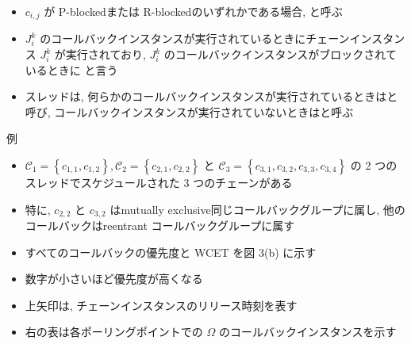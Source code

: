 \begin{frame}{}
    \begin{itemize}
        \item $c_{i, j}$ が P-blockedまたは R-blockedのいずれかである場合, と呼ぶ
        \item $J_{i}^{k}$ のコールバックインスタンスが実行されているときにチェーンインスタンス $J_{i}^{k}$ が実行されており, $J_{i}^{k}$ のコールバックインスタンスがブロックされているときに と言う
        \item スレッドは, 何らかのコールバックインスタンスが実行されているときはと呼び, コールバックインスタンスが実行されていないときはと呼ぶ
    \end{itemize}
\end{frame}

\begin{frame}{例}
    \begin{itemize}
        \item $\mathcal{C}_{1}=\left\{c_{1,1}, c_{1,2}\right\}, \mathcal{C}_{2}=\left\{c_{2,1}, c_{2,2}\right\}$ と $\mathcal{C}_{3}=\left\{c_{3,1}, c_{3,2}, c_{3,3}, c_{3,4}\right\}$ の 2 つのスレッドでスケジュールされた 3 つのチェーンがある
        \item 特に, $c_{2,2}$ と $c_{3,2}$ はmutually exclusive同じコールバックグループに属し, 他のコールバックはreentrant コールバックグループに属す
        \item すべてのコールバックの優先度と WCET を図 3(b) に示す
        \item 数字が小さいほど優先度が高くなる

    \end{itemize}
    \centering
\end{frame}


\begin{frame}{}
    \begin{itemize}
        \item 上矢印は, チェーンインスタンスのリリース時刻を表す
        \item 右の表は各ポーリングポイントでの $\Omega$ のコールバックインスタンスを示す
    \end{itemize}
    \centering
\end{frame}

